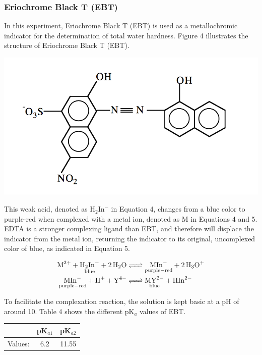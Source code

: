 \documentclass{article}
\begin{document}
\subsubsection {Eriochrome Black T (EBT)}
In this experiment, Eriochrome Black T (EBT) is used as a metallochromic indicator for the
determination of total water hardness.
Figure 4 illustrates the structure of Eriochrome Black T (EBT). \cite{IUS}
\begin{center}
        \includegraphics[scale=0.5]{EBT}
\end{center}

This weak acid, denoted as H$_2$In$^-$ in Equation 4, changes from a
blue color to purple-red when complexed with a metal ion, denoted as M in
Equations 4 and 5.  EDTA is a stronger complexing ligand than EBT, and therefore
will displace the indicator from the metal ion, returning the indicator to its
original, uncomplexed color of blue, as indicated in Equation 5. \cite{mtsu}
\begin{center} 
\begin{align}
        \ce {M^2+ + $\underset{\mathrm{blue}}{\ce{H_2In^-}}$ + 2H2O 
        &<=> $\underset{\mathrm{purple-red}}{\ce{MIn^-}}$ + 2H3O^+}\\ 
        \ce {$\underset{\mathrm{purple-red}}{\ce{MIn-}}$ + H^+ + Y^4- 
        &<=> $\underset{\mathrm{blue}}{\ce{MY^2-}}$ + HIn^2-} 
\end{align} 
\end{center}

To facilitate the complexation reaction, the solution is kept basic at a pH of
around 10. Table 4 shows the different pK$_a$ values of EBT. \cite{chemwiki}
\begin{center}
        \begin{tabular}{|c|c|c|}
                \hline
                & pK$_{a1}$ & pK$_{a2}$ \\
                \hline
                Values: & 6.2 & 11.55 \\
                \hline
        \end{tabular}
\end{center}
\end{document}
